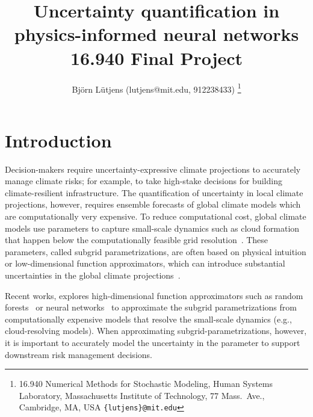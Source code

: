 \documentclass[letterpaper, 10 pt, conference, twocolumn]{ieeeconf}  %
\title{\LARGE \bf Uncertainty quantification in physics-informed neural networks \\ 16.940 Final Project}
\author{Bj{\"o}rn L{\"u}tjens (lutjens@mit.edu, 912238433)%
\thanks{\hspace*{-.17in} 16.940 Numerical Methods for Stochastic Modeling, Human Systems Laboratory, Massachusetts Institute of Technology, 77 Mass.\ Ave., Cambridge, MA, USA {\tt\footnotesize \{lutjens\}@mit.edu}}%
}
\makeatletter
\def\bstctlcite#1{\@bsphack
  \@for\@citeb:=#1\do{%
    \edef\@citeb{\expandafter\@firstofone\@citeb}%
    \if@filesw\immediate\write\@auxout{\string\citation{\@citeb}}\fi}%
  \@esphack}
\makeatother
\begin{document}

\maketitle
\thispagestyle{empty}
\pagestyle{empty}

\section{Introduction}\label{sec:intro}

Decision-makers require uncertainty-expressive climate projections to accurately manage climate risks; for example, to take high-stake decisions for building climate-resilient infrastructure. The quantification of uncertainty in local climate projections, however, requires ensemble forecasts of global climate models which are computationally very expensive. To reduce computational cost, global climate models use parameters to capture small-scale dynamics such as cloud formation that happen below the computationally feasible grid resolution~\cite{Yuval_2020}. These parameters, called subgrid parametrizations, are often based on physical intuition or low-dimensional function approximators, which can introduce substantial uncertainties in the global climate projections~\cite{Yuval_2020}. 

Recent works, explores high-dimensional function approximators such as random forests~\cite{Yuval_2020} or neural networks~\cite{Rackauckas_2020} to approximate the subgrid parametrizations from computationally expensive models that resolve the small-scale dynamics (e.g., cloud-resolving models). When approximating subgrid-parametrizations, however, it is important to accurately model the uncertainty in the parameter to support downstream risk management decisions. 
\end{document}

